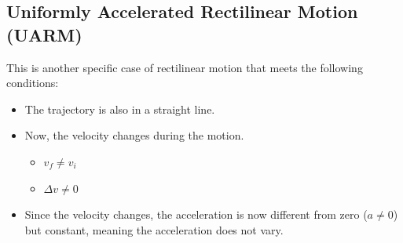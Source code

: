 

\subsection{Uniformly Accelerated Rectilinear Motion (UARM)}

This is another specific case of rectilinear motion that meets the following conditions:
\begin{itemize}
    \item The trajectory is also in a straight line.
    \item Now, the velocity changes during the motion.
    \begin{itemize}
        \item \( v_f \neq v_i \)
        \item \( \Delta v \neq  0 \)
    \end{itemize}
    \item Since the velocity changes, the acceleration is now different from zero (\( a \neq 0 \)) but constant, meaning the acceleration does not vary.
\end{itemize}

